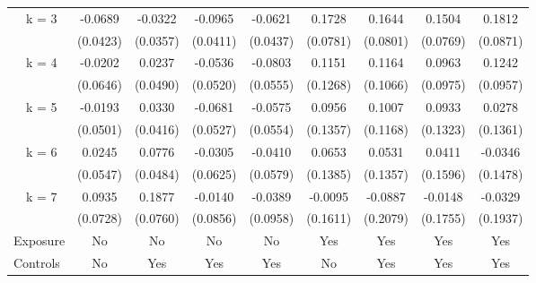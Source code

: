 {\begin{tabular}{l*{8}{c}}
\addlinespace
~~k = 3         &  -0.0689         &  -0.0322         &  -0.0965\sym{*}  &  -0.0621         &   0.1728\sym{*}  &   0.1644\sym{*}  &   0.1504         &   0.1812\sym{*}  \\
                & (0.0423)         & (0.0357)         & (0.0411)         & (0.0437)         & (0.0781)         & (0.0801)         & (0.0769)         & (0.0871)         \\
\addlinespace
~~k = 4         &  -0.0202         &   0.0237         &  -0.0536         &  -0.0803         &   0.1151         &   0.1164         &   0.0963         &   0.1242         \\
                & (0.0646)         & (0.0490)         & (0.0520)         & (0.0555)         & (0.1268)         & (0.1066)         & (0.0975)         & (0.0957)         \\
\addlinespace
~~k = 5         &  -0.0193         &   0.0330         &  -0.0681         &  -0.0575         &   0.0956         &   0.1007         &   0.0933         &   0.0278         \\
                & (0.0501)         & (0.0416)         & (0.0527)         & (0.0554)         & (0.1357)         & (0.1168)         & (0.1323)         & (0.1361)         \\
\addlinespace
~~k = 6         &   0.0245         &   0.0776         &  -0.0305         &  -0.0410         &   0.0653         &   0.0531         &   0.0411         &  -0.0346         \\
                & (0.0547)         & (0.0484)         & (0.0625)         & (0.0579)         & (0.1385)         & (0.1357)         & (0.1596)         & (0.1478)         \\
\addlinespace
~~k = 7         &   0.0935         &   0.1877\sym{*}  &  -0.0140         &  -0.0389         &  -0.0095         &  -0.0887         &  -0.0148         &  -0.0329         \\
                & (0.0728)         & (0.0760)         & (0.0856)         & (0.0958)         & (0.1611)         & (0.2079)         & (0.1755)         & (0.1937)         \\
\addlinespace
Exposure        &     {No}         &     {No}         &     {No}         &     {No}         &    {Yes}         &    {Yes}         &    {Yes}         &    {Yes}         \\
\addlinespace
Controls        &     {No}         &    {Yes}         &    {Yes}         &    {Yes}         &     {No}         &    {Yes}         &    {Yes}         &    {Yes}         \\

\end{tabular}}

